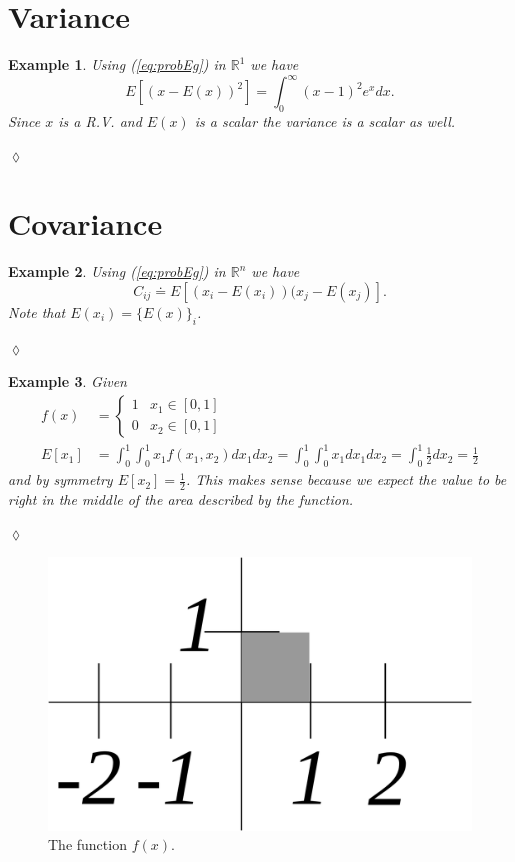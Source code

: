 \documentclass[lecture,12pt,]{pcms-l}
\theoremstyle{example}
\newtheorem{example}{Example}[section]
\begin{document}
\section{Variance}
\begin{example}
Using (\ref{eq:probEg}) in $\mathbb{R}^1$ we have
$$E[(x - E(x))^2] = \int_0^\infty (x-1)^2e^xdx.$$
Since $x$ is a R.V. and $E(x)$ is a scalar the variance is a scalar as well.
\end{example}
$\lozenge$

\section{Covariance}
\begin{example}
Using (\ref{eq:probEg}) in $\mathbb{R}^n$ we have $$C_{ij} \doteq E[(x_i - E(x_i))(x_j - E(x_j)].$$ Note that $E(x_i) = \lbrace E(x) \rbrace_i$.
\end{example}
$\lozenge$

\begin{example}
Given
\begin{align*}
f(x) &= \begin{cases} 1 & x_1 \in [0,1] \\ 0 & x_2 \in [0,1] \end{cases} \\
E[x_1] &= \int_0^1 \int_0^1 x_1f(x_1,x_2)dx_1dx_2 = \int_0^1 \int_0^1 x_1dx_1dx_2 = \int_0^1 \frac{1}{2}dx_2 = \frac{1}{2}
\end{align*}
and by symmetry $E[x_2] = \frac{1}{2}$. This makes sense because we expect the value to be right in the middle of the area described by the function.
\end{example}
$\lozenge$
\begin{figure}[ht!]
	\centering
	\includegraphics[width=.45\textwidth]{images/01box}
	\caption{The function $f(x)$.}
	\label{fig:01box}
\end{figure}
\end{document}
